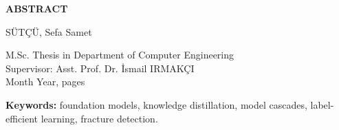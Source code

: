 \begin{center}\textbf{ABSTRACT}\end{center}
\begin{center}\textbf{\tezadien}\end{center}
\begin{center}SÜTÇÜ, Sefa Samet\end{center}
\begin{center}
M.Sc. Thesis in Department of Computer Engineering\\
Supervisor: Asst. Prof. Dr. İsmail IRMAKÇI\\
Month Year, \pageref{lastpage} pages
\end{center}


\begin{small}\textbf{Keywords:} foundation models, knowledge distillation, model cascades, label-efficient learning, fracture detection.
\end{small}

\bossayfa
